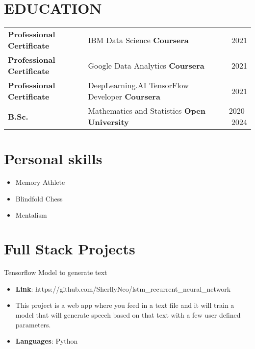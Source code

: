 \documentclass[10pt]{article}
\begin{document}
{\section*{\bf EDUCATION}
\begin{center}  %
\begin{tabular*}{1.0\textwidth}%
   {@{\extracolsep{\fill}}llr}
{\bf Professional Certificate}	& 	IBM Data Science \bf{Coursera}&       2021 \\
{\bf Professional Certificate}	& 	Google Data Analytics \bf{Coursera} & 2021 \\
{\bf Professional Certificate}	& 	  DeepLearning.AI TensorFlow Developer  \bf{Coursera}& 2021 \\
{\bf B.Sc.}	& 	Mathematics and Statistics	\bf{Open University}& 	2020-2024 	\\
		
\end{tabular*}
\end{center} 




\renewcommand{\labelitemi}{$\bullet$}

\section*{\bf Personal skills}
\begin{itemize}
\setlength{\itemsep}{0.10ex}
\item  Memory Athlete 
\item  Blindfold Chess
\item  Mentalism 
\end{itemize}


\newpage


\section*{\bf Full Stack Projects}


Tensorflow Model to generate text
\begin{itemize}
\setlength{\itemsep}{0.10ex}
\item {\bf Link}: https://github.com/SherllyNeo/lstm\_recurrent\_neural\_network
\item This project is a web app where you feed in a text file and it will train a model that will generate speech based on that text with a few user defined parameters. 
\item {\bf Languages}: Python
\end{itemize}

}
\end{document}
